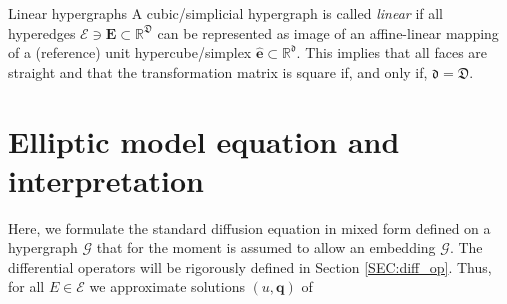 \documentclass[a4paper, english, 12pt, reqno, draft]{amsart}
\makeatletter
\theoremstyle{definition}
\theoremstyle{remark}
\numberwithin{equation}{section}
\newcommand{\graph}{\ensuremath{\mathcal G}}
\newcommand{\setEdge}{\ensuremath{\mathcal E}}
\newcommand{\edge}{\ensuremath{E}}
\newcommand{\Graph}{\ensuremath{\boldsymbol{\mathcal G}}}
\newcommand{\SetEdge}{\ensuremath{\boldsymbol{\mathcal E}}}
\newcommand{\Edge}{{\ensuremath{\boldsymbol E}}}
\newcommand{\RefEdge}{{\ensuremath{\widehat{\boldsymbol e}}}}
\newcommand{\locDim}{\ensuremath{\mathfrak d}}
\newcommand{\globDim}{\ensuremath{\mathfrak D}}
\newcommand{\IR}{\ensuremath{\mathbb R}}
\renewcommand{\vec}[1]{\ensuremath{\boldsymbol{#1}}}
\def\paragraph{\@startsection{paragraph}{4}%
  \z@\z@{-\fontdimen2\font}%
  {\normalfont\scshape}}
\makeatother
\begin{document}
\paragraph{Linear hypergraphs}
% 
A cubic/simplicial hypergraph is called \emph{linear} if all hyperedges $\SetEdge \ni \Edge \subset \IR^\globDim$ can be represented as image of an affine-linear mapping of a (reference) unit hypercube/simplex $\RefEdge \subset \IR^\locDim$. This implies that all faces are straight and that the transformation matrix is square if, and only if, $\locDim = \globDim$.
% 
\section{Elliptic model equation and interpretation}\label{SEC:model_eq}
% 
Here, we formulate the standard diffusion equation in mixed form defined on a hypergraph $\graph$ that for the moment is assumed to allow an embedding $\Graph$. The differential operators will be rigorously defined in Section \ref{SEC:diff_op}. Thus, for all $\edge \in \setEdge$ we approximate solutions $(u, \vec q)$ of
% 
\end{document}
